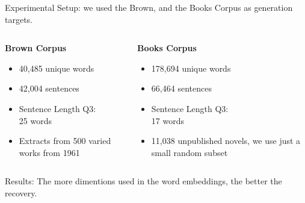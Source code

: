 \documentclass[]{beamer}
\begin{document}
\begin{frame}{Experimental Setup: we used the Brown, and the Books Corpus as generation targets.}
				
	\begin{columns}[T]
		\begin{column}{0.5\textwidth}
			\textbf{Brown Corpus}
			\begin{itemize}
				\item 40,485 unique words
				\item 42,004 sentences
				\item Sentence Length Q3: \\\hfill 25 words
				\item Extracts from 500 varied works from 1961
			\end{itemize} 
		\end{column}
		\begin{column}{0.5\textwidth}
			\pause
			\textbf{Books Corpus}
			\begin{itemize}
				\item 178,694 unique words
				\item 66,464 sentences 
				\item Sentence Length Q3: \\\hfill 17 words
				\item 11,038 unpublished novels, we use just a small random subset
			\end{itemize}
		\end{column}
	\end{columns}

\end{frame}

\begin{frame}{Results: The more dimentions used in the word embeddings, the better the recovery.}
	\begin{table}
	\end{table}
\end{frame}
\end{document}
